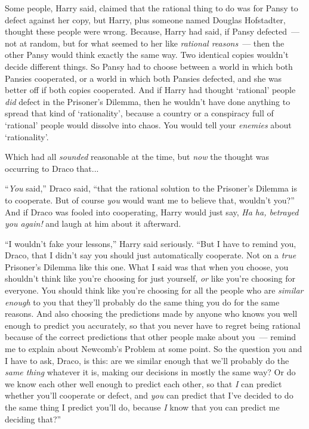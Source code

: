 Some people, Harry said, claimed that the rational thing to do was for Pansy to defect against her copy, but Harry, plus someone named Douglas Hofstadter, thought these people were wrong. Because, Harry had said, if Pansy defected~--- not at random, but for what seemed to her like \emph{rational reasons}~--- then the other Pansy would think exactly the same way. Two identical copies wouldn't decide different things. So Pansy had to choose between a world in which both Pansies cooperated, or a world in which both Pansies defected, and she was better off if both copies cooperated. And if Harry had thought `rational' people \emph{did} defect in the Prisoner's Dilemma, then he wouldn't have done anything to spread that kind of `rationality', because a country or a conspiracy full of `rational' people would dissolve into chaos. You would tell your \emph{enemies} about `rationality'.

Which had all \emph{sounded} reasonable at the time, but \emph{now} the thought was occurring to Draco that...

``\emph{You} said,'' Draco said, ``that the rational solution to the Prisoner's Dilemma is to cooperate. But of course \emph{you} would want me to believe that, wouldn't you?'' And if Draco was fooled into cooperating, Harry would just say, \emph{Ha ha, betrayed you again!} and laugh at him about it afterward.

``I wouldn't fake your lessons,'' Harry said seriously. ``But I have to remind you, Draco, that I didn't say you should just automatically cooperate. Not on a \emph{true} Prisoner's Dilemma like this one. What I said was that when you choose, you shouldn't think like you're choosing for just yourself, \emph{or} like you're choosing for everyone. You should think like you're choosing for all the people who are \emph{similar enough} to you that they'll probably do the same thing you do for the same reasons. And also choosing the predictions made by anyone who knows you well enough to predict you accurately, so that you never have to regret being rational because of the correct predictions that other people make about you~--- remind me to explain about Newcomb's Problem at some point. So the question you and I have to ask, Draco, is this: are we similar enough that we'll probably do the \emph{same thing} whatever it is, making our decisions in mostly the same way? Or do we know each other well enough to predict each other, so that \emph{I} can predict whether you'll cooperate or defect, and \emph{you} can predict that I've decided to do the same thing I predict you'll do, because \emph{I} know that you can predict me deciding that?''


